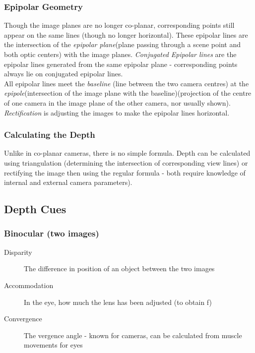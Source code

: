 \subsubsection{Epipolar Geometry}
Though the image planes are no longer co-planar, corresponding points still appear on the same lines (though no longer horizontal). These epipolar lines are the intersection of the \emph{epipolar plane}(plane passing through a scene point and both optic centers) with the image planes. \emph{Conjugated Epipolar lines} are the epipolar lines generated from the same epipolar plane - corresponding points always lie on conjugated epipolar lines.\\

All epipolar lines meet the \emph{baseline} (line between the two camera centres) at the \emph{epipole}(intersection of the image plane with the baseline)(projection of the centre of one camera in the image plane of the other camera, nor usually shown).\\

\emph{Rectification} is adjusting the images to make the epipolar lines horizontal.

\subsubsection{Calculating the Depth}
Unlike in co-planar cameras, there is no simple formula. Depth can be calculated using triangulation (determining the intersection of corresponding view lines) or rectifying the image then using the regular formula - both require knowledge of internal and external camera parameters).

\subsection{Depth Cues}
\subsubsection{Binocular (two images)}
\begin{description}
    \item[Disparity] The difference in position of an object between the two images
    \item[Accommodation] In the eye, how much the lens has been adjusted (to obtain f)
    \item[Convergence] The vergence angle - known for cameras, can be calculated from muscle movements for eyes
\end{description}

